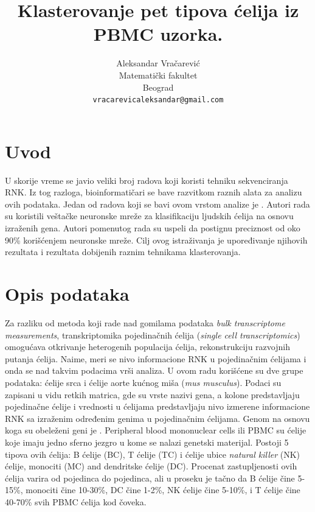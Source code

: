 \documentclass{article}
\title{Klasterovanje pet tipova ćelija iz PBMC uzorka.}
\author{
  Aleksandar Vračarević\\
  Matematički fakultet\\
  Beograd \\
  \texttt{vracarevicaleksandar@gmail.com}
}
\begin{document}
\maketitle


\section{Uvod}

U skorije vreme se javio veliki broj radova koji koristi tehniku sekvenciranja RNK. Iz tog razloga, bioinformatičari se bave razvitkom raznih alata za analizu ovih podataka. Jedan od radova koji se bavi ovom vrstom analize je \cite{PBMC_ANN_classification}. Autori rada su koristili veštačke neuronske mreže za klasifikaciju ljudskih ćelija na osnovu izraženih gena. Autori pomenutog rada su uspeli da postignu preciznost od oko 90\% korišćenjem neuronske mreže. Cilj ovog istraživanja je upoređivanje njihovih rezultata i rezultata dobijenih raznim tehnikama klasterovanja.

\section{Opis podataka}

Za razliku od metoda koji rade nad gomilama podataka \emph{bulk transcriptome measurements}, transkriptomika pojedinačnih ćelija (\emph{single cell transcriptomics}) omogućava otkrivanje heterogenih populacija ćelija, rekonstrukciju razvojnih putanja ćelija. Naime, meri se nivo informacione RNK u pojedinačnim ćelijama i onda se nad takvim podacima vrši analiza. U ovom radu korišćene su dve grupe podataka: ćelije srca i ćelije aorte kućnog miša (\emph{mus musculus}). Podaci su zapisani u vidu retkih matrica, gde su vrste nazivi gena, a kolone predstavljaju pojedinačne ćelije i vrednosti u ćelijama predstavljaju nivo izmerene informacione RNK sa izraženim određenim genima u pojedinačnim ćelijama. Genom na osnovu koga su obeleženi geni je . Peripheral blood mononuclear cells ili PBMC su ćelije koje imaju jedno sferno jezgro u kome se nalazi genetski materijal. Postoji 5 tipova ovih ćelija: B ćelije (BC), T ćelije (TC) i ćelije ubice \emph{natural killer} (NK) ćelije, monociti (MC) and dendritske ćelije (DC). Procenat zastupljenosti ovih ćelija varira od pojedinca do pojedinca, ali u proseku je tačno da B ćelije čine 5-15\%, monociti čine 10-30\%, DC čine 1-2\%, NK ćelije čine 5-10\%, i T ćelije čine 40-70\% svih PBMC ćelija kod čoveka. 
\end{document}
